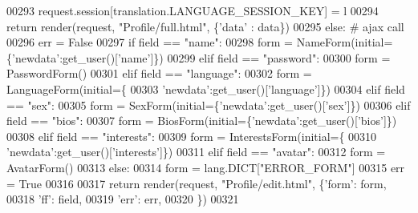 \begin{DoxyCode}
00293                 request.session[translation.LANGUAGE\_SESSION\_KEY] = l
00294                 \textcolor{keywordflow}{return} render(request, \textcolor{stringliteral}{"Profile/full.html"}, \{\textcolor{stringliteral}{'data'} : data\})
00295             \textcolor{keywordflow}{else}: \textcolor{comment}{# ajax call}
00296                 err = \textcolor{keyword}{False}
00297                 \textcolor{keywordflow}{if}   field == \textcolor{stringliteral}{"name"}:
00298                     form = NameForm(initial=\{\textcolor{stringliteral}{'newdata'}:get\_user()[\textcolor{stringliteral}{'name'}]\})
00299                 \textcolor{keywordflow}{elif} field == \textcolor{stringliteral}{"password"}:
00300                     form = PasswordForm()
00301                 \textcolor{keywordflow}{elif} field == \textcolor{stringliteral}{"language"}:
00302                     form = LanguageForm(initial=\{
00303                             \textcolor{stringliteral}{'newdata'}:get\_user()[\textcolor{stringliteral}{'language'}]\})
00304                 \textcolor{keywordflow}{elif} field == \textcolor{stringliteral}{"sex"}:
00305                     form = SexForm(initial=\{\textcolor{stringliteral}{'newdata'}:get\_user()[\textcolor{stringliteral}{'sex'}]\})
00306                 \textcolor{keywordflow}{elif} field == \textcolor{stringliteral}{"bios"}:
00307                     form = BiosForm(initial=\{\textcolor{stringliteral}{'newdata'}:get\_user()[\textcolor{stringliteral}{'bios'}]\})
00308                 \textcolor{keywordflow}{elif} field == \textcolor{stringliteral}{"interests"}:
00309                     form = InterestsForm(initial=\{
00310                             \textcolor{stringliteral}{'newdata'}:get\_user()[\textcolor{stringliteral}{'interests'}]\})
00311                 \textcolor{keywordflow}{elif} field == \textcolor{stringliteral}{"avatar"}:
00312                     form = AvatarForm()
00313                 \textcolor{keywordflow}{else}:
00314                     form = lang.DICT[\textcolor{stringliteral}{"ERROR\_FORM"}]
00315                     err = \textcolor{keyword}{True} 
00316 
00317                 \textcolor{keywordflow}{return} render(request, \textcolor{stringliteral}{"Profile/edit.html"}, \{\textcolor{stringliteral}{'form'}: form,
00318                                                              \textcolor{stringliteral}{'ff'}: field,
00319                                                              \textcolor{stringliteral}{'err'}: err,
00320                                                             \})
00321         

\end{DoxyCode}


